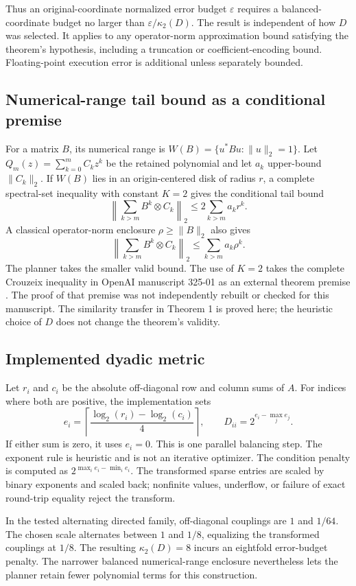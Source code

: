 \documentclass[10pt]{article}
\begin{document}
Thus an original-coordinate normalized error budget $\varepsilon$ requires a balanced-coordinate budget no larger than $\varepsilon/\kappa_2(D)$. The result is independent of how $D$ was selected. It applies to any operator-norm approximation bound satisfying the theorem's hypothesis, including a truncation or coefficient-encoding bound. Floating-point execution error is additional unless separately bounded.

\subsection{Numerical-range tail bound as a conditional premise}

For a matrix $B$, its numerical range is $W(B)=\{u^*Bu:\|u\|_2=1\}$. Let $Q_m(z)=\sum_{k=0}^{m}C_kz^k$ be the retained polynomial and let $a_k$ upper-bound $\|C_k\|_2$. If $W(B)$ lies in an origin-centered disk of radius $r$, a complete spectral-set inequality with constant $K=2$ gives the conditional tail bound
\[
\left\|\sum_{k>m}B^k\otimes C_k\right\|_2
\le 2\sum_{k>m}a_k r^k.
\]
A classical operator-norm enclosure $\rho\ge\|B\|_2$ also gives
\[
\left\|\sum_{k>m}B^k\otimes C_k\right\|_2
\le \sum_{k>m}a_k\rho^k.
\]
The planner takes the smaller valid bound. The use of $K=2$ takes the complete Crouzeix inequality in OpenAI manuscript 325-01 as an external theorem premise \cite{openai32501}. The proof of that premise was not independently rebuilt or checked for this manuscript. The similarity transfer in Theorem 1 is proved here; the heuristic choice of $D$ does not change the theorem's validity.

\subsection{Implemented dyadic metric}

Let $r_i$ and $c_i$ be the absolute off-diagonal row and column sums of $A$. For indices where both are positive, the implementation sets
\[
e_i=\left\lceil\frac{\log_2(r_i)-\log_2(c_i)}{4}\right\rceil,\qquad
D_{ii}=2^{e_i-\max_j e_j}.
\]
If either sum is zero, it uses $e_i=0$. This is one parallel balancing step. The exponent rule is heuristic and is not an iterative optimizer. The condition penalty is computed as $2^{\max_i e_i-\min_i e_i}$. The transformed sparse entries are scaled by binary exponents and scaled back; nonfinite values, underflow, or failure of exact round-trip equality reject the transform.

In the tested alternating directed family, off-diagonal couplings are $1$ and $1/64$. The chosen scale alternates between $1$ and $1/8$, equalizing the transformed couplings at $1/8$. The resulting $\kappa_2(D)=8$ incurs an eightfold error-budget penalty. The narrower balanced numerical-range enclosure nevertheless lets the planner retain fewer polynomial terms for this construction.
\end{document}
